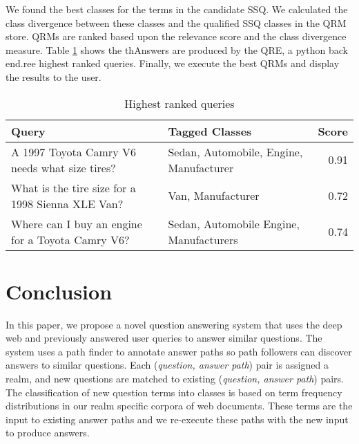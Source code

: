 We found the best classes for the terms in the candidate SSQ. We calculated the class divergence between these classes and the qualified SSQ classes in the QRM store. QRMs are ranked based upon the relevance score and the class divergence measure. Table \ref{tbl:ranked_queries} shows the thAnswers are produced by the QRE, a python back end.ree highest ranked queries. Finally, we execute the best QRMs and display the results to the user.



\begin{table}[!]\footnotesize

\begin{tabular}{| p{3.5cm} | p{3cm} | r |}
	\hline
	Query & Tagged Classes & Score\\ 
	\hline
	\small A 1997 Toyota Camry V6 needs what size tires? & \small Sedan, Automobile, Engine, Manufacturer & 0.91\\ 
	\hline 
	\small What is the tire size for a 1998 Sienna XLE Van? & \small Van, Manufacturer & 0.72\\
	\hline 
	\small Where can I buy an engine for a Toyota Camry V6? & \small Sedan, Automobile Engine, Manufacturers & 0.74 \\
	\hline 
\end{tabular}

\caption{Highest ranked queries}
\label{tbl:ranked_queries}   

\end{table}


\section{Conclusion}

In this paper, we propose a novel question answering system that uses the deep web and previously answered user queries to answer similar questions. The system uses a path finder to annotate answer paths so path followers can discover answers to similar questions.  Each (\emph{question, answer path}) pair is assigned a realm, and new questions are matched to existing (\emph{question, answer path}) pairs. The classification of new question terms into classes is based on term frequency distributions in our realm specific corpora of web documents.  These terms are the input to existing answer paths and we re-execute these paths with the new input to produce answers.

